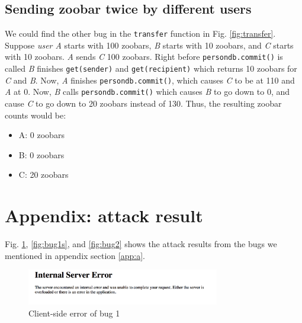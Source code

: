 \documentclass{llncs}
\begin{document}
\subsection{Sending zoobar twice by different users}

We could find the other bug in the \texttt{transfer} function in
Fig. \ref{fig:transfer}. Suppose \textit{user A} starts with 100
zoobars, \textit{B} starts with 10 zoobars, and \textit{C} starts with
10 zoobars. \textit{A} sends \textit{C} 100 zoobars. Right before
\texttt{persondb.commit()} is called \textit{B} finishes
\texttt{get(sender)} and \texttt{get(recipient)} which returns 10
zoobars for \textit{C} and \textit{B}. Now, \textit{A} finishes
\texttt{persondb.commit()}, which causes \textit{C} to be at 110 and
\textit{A} at 0. Now, \textit{B} calls \texttt{persondb.commit()}
which causes \textit{B} to go down to 0, and cause \textit{C} to go
down to 20 zoobars instead of 130. Thus, the resulting zoobar counts
would be:
\begin{itemize}
\item A: 0 zoobars
\item B: 0 zoobars
\item C: 20 zoobars
\end{itemize}

\section{Appendix: attack result}

Fig. \ref{fig:bug1c}, \ref{fig:bug1s}, and \ref{fig:bug2} shows the
attack results from the bugs we mentioned in appendix section
\ref{app:a}.

\begin{figure}
  \begin{center}
    \includegraphics[width=0.75\textwidth]{bug1c.png}
  \end{center}
  \caption{Client-side error of bug 1}
  \label{fig:bug1c}
\end{figure}
\end{document}
